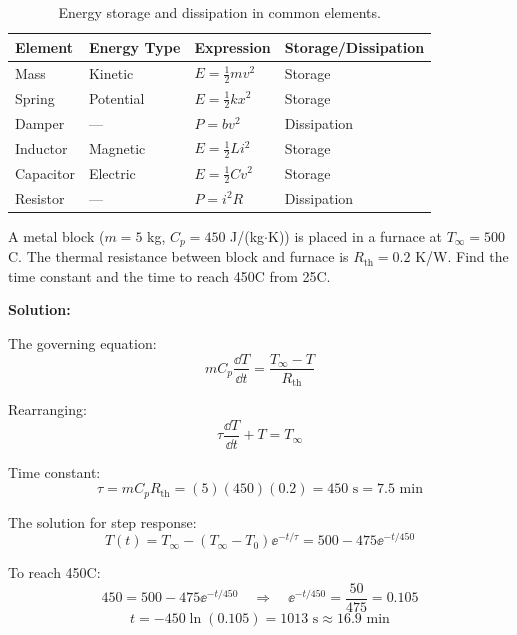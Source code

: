 \begin{table}[htbp]
\centering
\begin{tabular}{llll}
\toprule
\textbf{Element} & \textbf{Energy Type} & \textbf{Expression} & \textbf{Storage/Dissipation} \\
\midrule
Mass & Kinetic & $E = \frac{1}{2}mv^2$ & Storage \\
Spring & Potential & $E = \frac{1}{2}kx^2$ & Storage \\
Damper & --- & $P = bv^2$ & Dissipation \\
Inductor & Magnetic & $E = \frac{1}{2}Li^2$ & Storage \\
Capacitor & Electric & $E = \frac{1}{2}Cv^2$ & Storage \\
Resistor & --- & $P = i^2R$ & Dissipation \\
\bottomrule
\end{tabular}
\caption{Energy storage and dissipation in common elements.}
\label{tab:energy_elements}
\end{table}

\begin{examplebox}[title=Example 3.4: Thermal System Modeling]
A metal block ($m = 5$ kg, $C_p = 450$ J/(kg$\cdot$K)) is placed in a furnace at $T_{\infty} = 500$\textdegree C. The thermal resistance between block and furnace is $R_{\text{th}} = 0.2$ K/W. Find the time constant and the time to reach 450\textdegree C from 25\textdegree C.

\textbf{Solution:}

The governing equation:
\begin{equation*}
mC_p\frac{\dd T}{\dd t} = \frac{T_{\infty} - T}{R_{\text{th}}}
\end{equation*}

Rearranging:
\begin{equation*}
\tau\frac{\dd T}{\dd t} + T = T_{\infty}
\end{equation*}

Time constant:
\begin{equation*}
\tau = mC_p R_{\text{th}} = (5)(450)(0.2) = 450 \text{ s} = 7.5 \text{ min}
\end{equation*}

The solution for step response:
\begin{equation*}
T(t) = T_{\infty} - (T_{\infty} - T_0)\ee^{-t/\tau} = 500 - 475\ee^{-t/450}
\end{equation*}

To reach 450\textdegree C:
\begin{equation*}
450 = 500 - 475\ee^{-t/450} \quad \Rightarrow \quad \ee^{-t/450} = \frac{50}{475} = 0.105
\end{equation*}
\begin{equation*}
t = -450\ln(0.105) = 1013 \text{ s} \approx 16.9 \text{ min}
\end{equation*}
\end{examplebox}


